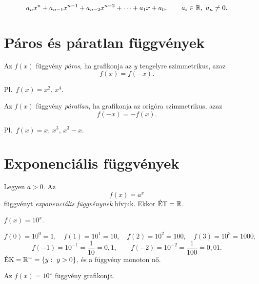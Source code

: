 \documentclass[11pt]{article}
\begin{document}
\begin{defbox}
\begin{definition}
\[
a_{n}x^{n}+a_{n-1}x^{n-1}+a_{n-2}x^{n-2}+\dots+a_{1}x+a_{0},
\qquad a_{i}\in\R,\ a_{n}\neq 0 .
\]
\end{definition}
\end{defbox}

\section{Páros és páratlan függvények}

\begin{defbox}
\begin{definition}
Az $f(x)$ függvény \emph{páros}, ha grafikonja az $y$ tengelyre szimmetrikus, azaz
\[
f(x)=f(-x).
\]
\end{definition}
\end{defbox}
Pl.\ $f(x)=x^{2}$, $x^{4}$.

\begin{defbox}
\begin{definition}
Az $f(x)$ függvény \emph{páratlan}, ha grafikonja az origóra szimmetrikus, azaz
\[
f(-x)=-f(x).
\]
\end{definition}
\end{defbox}
Pl.\ $f(x)=x$, $x^{3}$, $x^{3}-x$.

\section{Exponenciális függvények}

\begin{defbox}
\begin{definition}
Legyen $a>0$. Az
\[
f(x)=a^{x}
\]
függvényt \emph{exponenciális függvénynek} hívjuk. Ekkor $\ET=\R$.
\end{definition}
\end{defbox}

\begin{exbox}
\begin{example}
$f(x)=10^{x}$.
\end{example}
\end{exbox}
\begin{solution}
\[
f(0)=10^{0}=1,\quad f(1)=10^{1}=10,\quad f(2)=10^{2}=100,\quad f(3)=10^{3}=1000,
\]
\[
f(-1)=10^{-1}=\frac{1}{10}=0,1,\qquad f(-2)=10^{-2}=\frac{1}{100}=0,01 .
\]
$\EK=\R^{+}=\{y:\ y>0\}$, és a függvény monoton nő.

\begin{notefig}{Az $f(x)=10^{x}$ függvény grafikonja.}
\end{notefig}
\end{solution}
\end{document}
